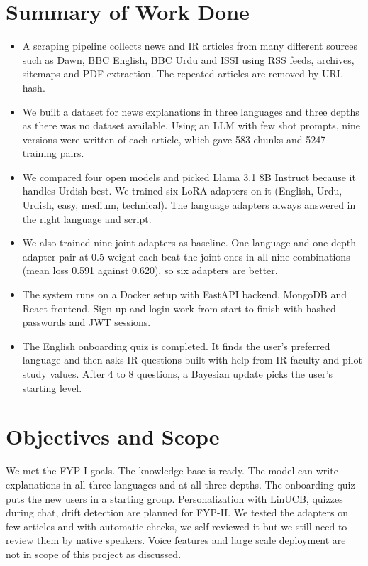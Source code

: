 \documentclass{FastFyp}
\begin{document}
\section{Summary of Work Done}

\begin{itemize}
    \item A scraping pipeline collects news and IR articles from many different sources such as Dawn, BBC English, BBC Urdu and ISSI using RSS feeds, archives, sitemaps and PDF extraction. The repeated articles are removed by URL hash.
    \item We built a dataset for news explanations in three languages and three depths as there was no dataset available. Using an LLM with few shot prompts, nine versions were written of each article, which gave 583 chunks and 5247 training pairs.
    \item We compared four open models and picked Llama 3.1 8B Instruct because it handles Urdish best. We trained six LoRA adapters on it (English, Urdu, Urdish, easy, medium, technical). The language adapters always answered in the right language and script.
    \item We also trained nine joint adapters as baseline. One language and one depth adapter pair at 0.5 weight each beat the joint ones in all nine combinations (mean loss 0.591 against 0.620), so six adapters are better.
    \item The system runs on a Docker setup with FastAPI backend, MongoDB and React frontend. Sign up and login work from start to finish with hashed passwords and JWT sessions.
    \item The English onboarding quiz is completed. It finds the user's preferred language and then asks IR questions built with help from IR faculty and pilot study values. After 4 to 8 questions, a Bayesian update picks the user's starting level.
\end{itemize}

\section{Objectives and Scope}

We met the FYP-I goals. The knowledge base is ready. The model can write explanations in all three languages and at all three depths. The onboarding quiz puts the new users in a starting group. Personalization with LinUCB, quizzes during chat, drift detection are planned for FYP-II. We tested the adapters on few articles and with automatic checks, we self reviewed it but we still need to review them by native speakers. Voice features and large scale deployment are not in scope of this project as discussed.
\end{document}
